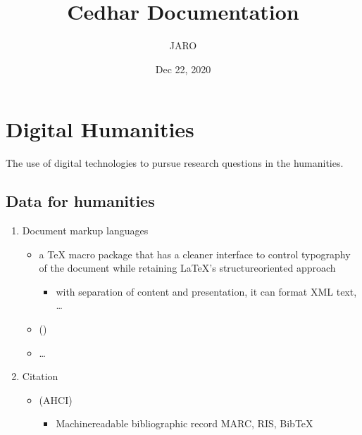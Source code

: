 \documentclass[a4paper,12pt,english]{sphinxhowto}
\title{Cedhar Documentation}
\date{Dec 22, 2020}
\author{JARO}
\begin{document}
\pagestyle{empty}
\sphinxmaketitle
\pagestyle{plain}
\sphinxtableofcontents
\pagestyle{normal}
\label{\detokenize{index::doc}}



\section{Digital Humanities}
\label{\detokenize{DDHH:digital-humanities}}\label{\detokenize{DDHH:ddhh}}\label{\detokenize{DDHH::doc}}
The use of digital technologies to pursue research questions in the humanities.


\subsection{Data for humanities}
\label{\detokenize{DDHH:data-for-humanities}}\begin{enumerate}
%
\item {} 
Document markup languages
\begin{itemize}
\item {} 
 a TeX macro package that has a cleaner interface to control typography of the document while retaining LaTeX’s structure\sphinxhyphen{}oriented approach
\begin{itemize}
\item {} 
with separation of content and presentation, it can format XML text, …

\end{itemize}

\item {} 
 ()

\item {} 
…

\end{itemize}

\item {} 
Citation
\begin{itemize}
\item {} 
 (AHCI)
\begin{itemize}
\item {} 
Machine\sphinxhyphen{}readable bibliographic record \sphinxhyphen{} MARC, RIS, BibTeX

\end{itemize}

\end{itemize}


\end{enumerate}
\end{document}
